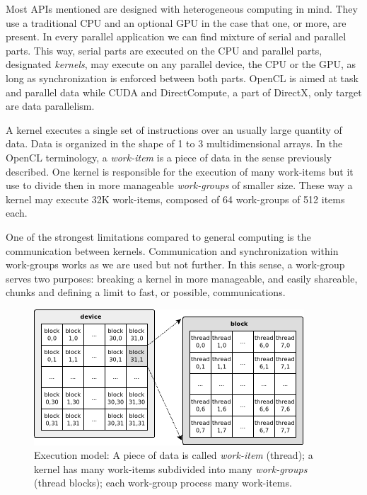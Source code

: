 \documentclass{article}
\begin{document}
Most APIs mentioned are designed with heterogeneous computing in
mind. They use a traditional CPU and an optional GPU in the case that
one, or more, are present. In every parallel application we can find
mixture of serial and parallel parts. This way, serial parts are
executed on the CPU and parallel parts, designated \textit{kernels},
may execute on any parallel device, the CPU or the GPU, as long as
synchronization is enforced between both parts. OpenCL is aimed at
task and parallel data while CUDA and DirectCompute, a part of
DirectX, only target are data parallelism.

A kernel executes a single set of instructions over an usually large
quantity of data. Data is organized in the shape of 1 to 3
multidimensional arrays. In the OpenCL terminology, a
\textit{work-item} is a
piece of data in the sense previously described. One kernel is
responsible for the execution of many work-items but it use to divide
then in more manageable \textit{work-groups} of smaller size. These
way a kernel may execute 32K work-items, composed of 64 work-groups of
512 items each.

One of the strongest limitations compared to general computing is the
communication between kernels. Communication and synchronization
within work-groups works as we are used but not further. In this
sense, a work-group serves two purposes: breaking a kernel in more
manageable, and easily shareable, chunks and defining a limit to fast, or
possible, communications.

\begin{figure}[!ht]
\centering
\includegraphics[width=0.9\textwidth]{grid}
\caption{Execution model: A piece of data is called {\it work-item} (thread); a kernel has many work-items subdivided into many {\it work-groups} (thread blocks); each work-group process many work-items.}
\label{figure:grid}
\end{figure}


\end{document}
